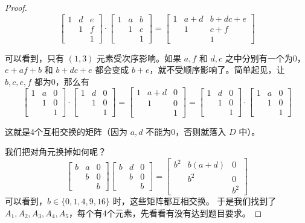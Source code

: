 \documentclass[12pt]{ctexart}  %
\begin{document}
\begin{proof}
\[
\begin{bmatrix}
1 & d & e \\
& 1 & f \\
& & 1
\end{bmatrix}
\cdot
\begin{bmatrix}
1 & a & b \\
& 1 & c \\
& & 1
\end{bmatrix}
=
\begin{bmatrix}
1 & a+d & b+dc+e \\
& 1 & c+f \\
& & 1
\end{bmatrix}
\]

\vspace{0.5em}
可以看到，只有 \((1,3)\) 元素受次序影响。如果 \(a,f\) 和 \(d,c\) 之中分别有一个为0，\(e+af+b\) 和 \(b+dc+e\) 都会变成 \(b+e\)，就不受顺序影响了。简单起见，让 \(b,c,e,f\) 都为0，那么有
\[
\begin{bmatrix}
1 & a & 0 \\
& 1 & 0 \\
& & 1
\end{bmatrix}
\cdot
\begin{bmatrix}
1 & d & 0 \\
& 1 & 0 \\
& & 1
\end{bmatrix}
=
\begin{bmatrix}
1 & a+d & 0 \\
& 1 & 0 \\
& & 1
\end{bmatrix}
=
\begin{bmatrix}
1 & d & 0 \\
& 1 & 0 \\
& & 1
\end{bmatrix}
\cdot
\begin{bmatrix}
1 & a & 0 \\
& 1 & 0 \\
& & 1
\end{bmatrix}
\]

这就是4个互相交换的矩阵（因为 \(a,d\) 不能为0，否则就落入 \(D\) 中）。

我们把对角元换掉如何呢？
\[
\begin{bmatrix}
b & a & 0 \\
& b & 0 \\
& & b
\end{bmatrix}
\begin{bmatrix}
b & d & 0 \\
& b & 0 \\
& & b
\end{bmatrix}
=
\begin{bmatrix}
b^2 & b(a+d) & 0 \\
& b^2 & 0 \\
& & b^2
\end{bmatrix}
\]
可以看到，\(b\in\{0,1,4,9,16\}\) 时，这些矩阵都互相交换。
于是我们找到了 \(A_1,A_2,A_3,A_4,A_5\)，每个有4个元素，先看看有没有达到题目要求。


\end{proof}
\end{document}
